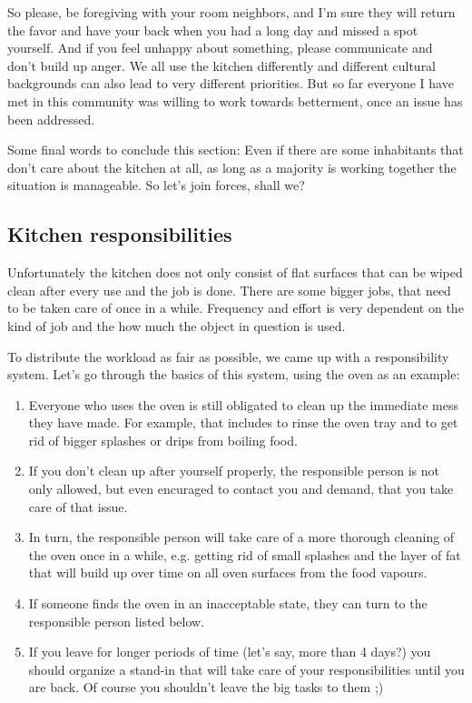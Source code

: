 So please, be foregiving with your room neighbors, and I'm sure they will return the favor and have your back when you had a long day and missed a spot yourself. And if you feel unhappy about something, please communicate and don't build up anger. We all use the kitchen differently and different cultural backgrounds can also lead to very different priorities. But so far everyone I have met in this community was willing to work towards betterment, once an issue has been addressed.

Some final words to conclude this section: Even if there are some inhabitants that don't care about the kitchen at all, as long as a majority is working together the situation is manageable. So let's join forces, shall we?

\subsection{Kitchen responsibilities}

Unfortunately the kitchen does not only consist of flat surfaces that can be wiped clean after every use and the job is done. There are some bigger jobs, that need to be taken care of once in a while. Frequency and effort is very dependent on the kind of job and the how much the object in question is used.

To distribute the workload as fair as possible, we came up with a responsibility system. Let's go through the basics of this system, using the oven as an example:
\begin{enumerate}
    \item Everyone who uses the oven is still obligated to clean up the immediate mess they have made. For example, that includes to rinse the oven tray and to get rid of bigger splashes or drips from boiling food.
    \item If you don't clean up after yourself properly, the responsible person is not only allowed, but even encuraged to contact you and demand, that you take care of that issue.
    \item In turn, the responsible person will take care of a more thorough cleaning of the oven once in a while, e.g. getting rid of small splashes and the layer of fat that will build up over time on all oven surfaces from the food vapours.
    \item If someone finds the oven in an inacceptable state, they can turn to the responsible person listed below.
    \item If you leave for longer periods of time (let's say, more than 4 days?) you should organize a stand-in that will take care of your responsibilities until you are back. Of course you shouldn't leave the big tasks to them ;)
\end{enumerate}

